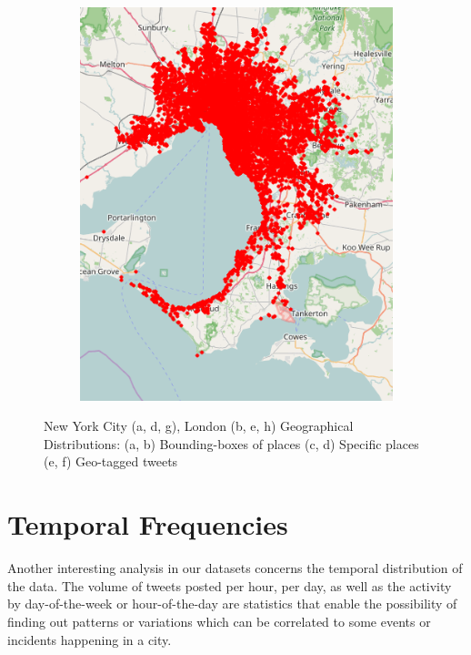 \begin{figure}[htbp]
	\quad
	\begin{subfigure}[htbp]{0.3\textwidth}
		\centering
		\includegraphics[width=1\linewidth]{figures/melbourne_points.png}
		\caption{}
		\label{subfig:melbourne_points}
	\end{subfigure}
	
	\caption[Exploratory analysis in English-speaking cities]{New York City (a, d, g), London (b, e, h) Geographical Distributions: (a, b) Bounding-boxes of places (c, d) Specific places (e, f) Geo-tagged tweets}
	\label{fig:nyc_london_melbourne_geographical_distribution}
\end{figure}

\section{Temporal Frequencies}

Another interesting analysis in our datasets concerns the temporal distribution of the data. The volume of tweets posted per hour, per day, as well as the activity by day-of-the-week or hour-of-the-day are statistics that enable the possibility of finding out patterns or variations which can be correlated to some events or incidents happening in a city.


